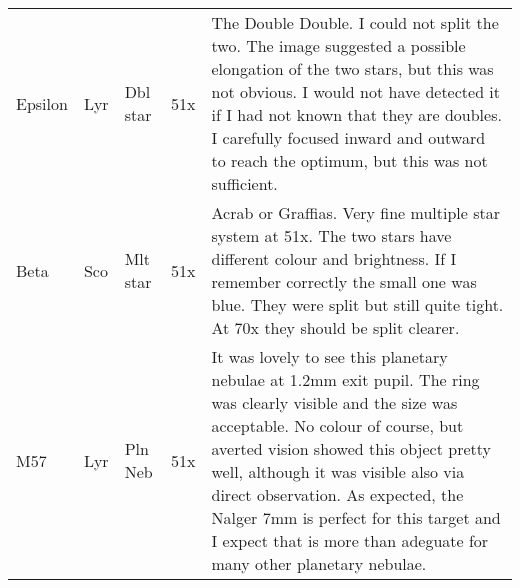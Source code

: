 \begin{longtable}{ p{0.7in}  p{0.3in}  p{0.6in}  p{0.9in}  p{5.8in} }
Epsilon & Lyr & Dbl star & 51x & The Double Double. I could not split the two. The image suggested a possible elongation of the two stars, but this was not obvious. I would not have detected it if I had not known that they are doubles. I carefully focused inward and outward to reach the optimum, but this was not sufficient.  \\ 
Beta & Sco & Mlt star & 51x & Acrab or Graffias. Very fine multiple star system at 51x. The two stars have different colour and brightness. If I remember correctly the small one was blue. They were split but still quite tight. At 70x they should be split clearer.  \\ 
M57 & Lyr & Pln Neb & 51x & It was lovely to see this planetary nebulae at 1.2mm exit pupil. The ring was clearly visible and the size was acceptable. No colour of course, but averted vision showed this object pretty well, although it was visible also via direct observation. As expected, the Nalger 7mm is perfect for this target and I expect that is more than adeguate for many other planetary nebulae. \\ 
\hline 
\end{longtable} 
